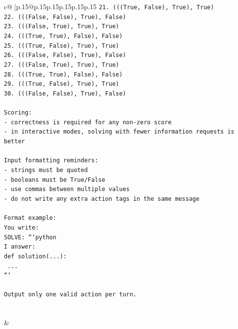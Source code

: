 \documentclass{article}
\begin{document}
{\begin{supertabular}{c@{$\;$}|p{.15\linewidth}@{}p{.15\linewidth}p{.15\linewidth}p{.15\linewidth}p{.15\linewidth}p{.15\linewidth}}
{{{\texttt{21. (((True, False), True), True)} \\
\texttt{22. (((False, False), True), False)} \\
\texttt{23. (((False, True), True), True)} \\
\texttt{24. (((True, True), False), False)} \\
\texttt{25. (((True, False), True), True)} \\
\texttt{26. (((False, False), True), False)} \\
\texttt{27. (((False, True), True), True)} \\
\texttt{28. (((True, True), False), False)} \\
\texttt{29. (((True, False), True), True)} \\
\texttt{30. (((False, False), True), False)} \\
\\ 
\texttt{Scoring:} \\
\texttt{{-} correctness is required for any non{-}zero score} \\
\texttt{{-} in interactive modes, solving with fewer information requests is better} \\
\\ 
\texttt{Input formatting reminders:} \\
\texttt{{-} strings must be quoted} \\
\texttt{{-} booleans must be True/False} \\
\texttt{{-} use commas between multiple values} \\
\texttt{{-} do not write any extra action tags in the same message} \\
\\ 
\texttt{Format example:} \\
\texttt{You write:} \\
\texttt{SOLVE: ```python} \\
\texttt{I answer:} \\
\texttt{def solution(...):} \\
\texttt{    ...} \\
\texttt{```} \\
\\ 
\texttt{Output only one valid action per turn.} \\
            }
        }
    }
     \\ \\

    \theutterance {}  
    & 
\end{supertabular}}
\end{document}
